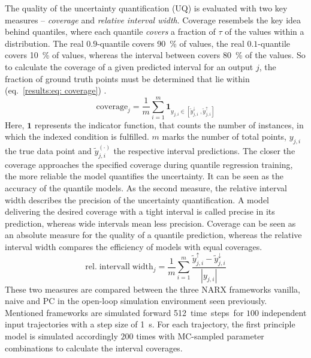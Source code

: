 The quality of the uncertainty quantification (UQ) is evaluated with two key measures – \emph{coverage} and 
\emph{relative interval width}. Coverage resembels the key idea behind quantiles, where
each quantile \emph{covers} a fraction of $\tau$ of the values within a distribution. The real $0.9$-quantile
covers \SI{90}{\%} of values, the real $0.1$-quantile covers \SI{10}{\%} of values, whereas the interval
between covers \SI{80}{\%} of the values. So to calculate the coverage of a given predicted interval
for an output $j$, the fraction of ground truth points must be determined that lie within (eq.~\ref{results:eq: coverage}) \cite{kemmerling2025}.
\begin{equation}
    \label{results:eq: coverage}
    \mathrm{coverage}_j = \frac{1}{m} \sum^m_{i=1} 
    \bm{1}_{y_{j,i} \in [\tilde{y}^\downarrow_{j,i} \;, \tilde{y}^\uparrow_{j,i}]}
\end{equation}
Here, $\bm{1}$ represents the indicator function, that counts the number of instances, in which the indexed 
condition is fulfilled. $m$ marks the number of total points, $y_{j,i}$ the true data point and $\tilde{y}_{j,i}^{(\cdot)}$
the respective interval predictions. The closer the coverage approaches the specified coverage during
quantile regression training, the more reliable the model quantifies the uncertainty.
It can be seen as the accuracy of the quantile models.
\newline
\newline
As the second measure, the relative interval width describes the precision of the uncertainty quantification.
A model delivering the desired coverage with a tight interval is called precise in its prediction, whereas 
wide intervals mean less precision. Coverage can be seen as an absolute measure for the quality of a
quantile prediction, whereas the relative interval width compares the efficiency
of models with equal coverages.
\begin{equation}
    \label{results:eq: relative interval width}
    \mathrm{rel. \; intervall \; width}_j = \frac{1}{m} \sum^m_{i=1} \frac{\tilde{y}^\uparrow_{j,i} - \tilde{y}^\downarrow_{j,i}}{|y_{j,i}|}
\end{equation}
\newline
These two measures are compared between the three NARX frameworks vanilla, naive and PC in the open-loop
simulation environment seen previously.
Mentioned frameworks are simulated forward \SI{512} time steps for $100$ independent input trajectories
with a step size of \SI{1}{\second}.
For each trajectory, the first principle model is simulated accordingly $200$ times with MC-sampled
parameter combinations to calculate the interval coverages. 

